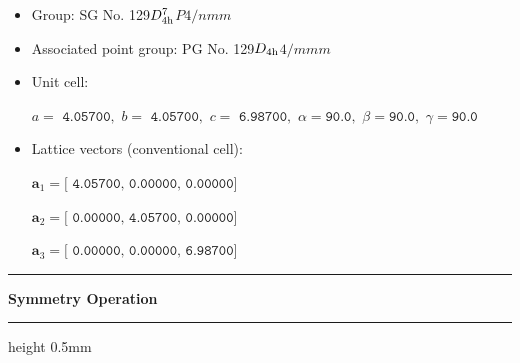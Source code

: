 \documentclass[fleqn,10pt,landscape]{jsarticle}
\begin{document}
\begin{itemize}
\item Group: SG No. 129\quad$D_{\rm 4h}^{7}$\quad$P4/nmm$\quad[ tetragonal ]
\item Associated point group: PG No. 129\quad$D_{\rm 4h}$\quad$4/mmm$\quad[ tetragonal ]
\end{itemize}
\begin{itemize}
\item Unit cell:

\quad $a=\texttt{ 4.05700},\,\, b=\texttt{ 4.05700},\,\, c=\texttt{ 6.98700},\,\, \alpha=\texttt{90.0},\,\, \beta=\texttt{90.0},\,\, \gamma=\texttt{90.0}$

\item Lattice vectors (conventional cell):

\quad $\bm{a}_1=\texttt{[ 4.05700, 0.00000, 0.00000]}$

\quad $\bm{a}_2=\texttt{[ 0.00000, 4.05700, 0.00000]}$

\quad $\bm{a}_3=\texttt{[ 0.00000, 0.00000, 6.98700]}$

\end{itemize}
\vspace{5mm}
\noindent \rule[0.5mm]{5mm}{0.5mm}\hspace{3mm}\textbf{Symmetry Operation}\hspace{3mm}\leaders\hrule height 0.5mm\hfill\kern0pt
\vspace{3mm}
\end{document}
